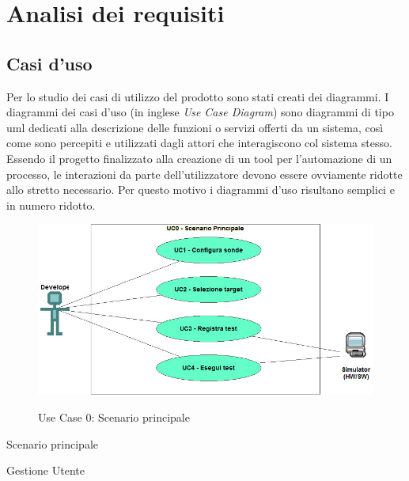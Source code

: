 \chapter{Analisi dei requisiti}
\label{chap:analisi-requisiti}

\section{Casi d'uso}
Per lo studio dei casi di utilizzo del prodotto sono stati creati dei diagrammi.
I diagrammi dei casi d'uso (in inglese \textit{Use Case Diagram}) sono diagrammi di tipo \gls{uml} dedicati alla descrizione delle funzioni o servizi offerti da un sistema, così come sono percepiti e utilizzati dagli attori che interagiscono col sistema stesso.
Essendo il progetto finalizzato alla creazione di un tool per l'automazione di un processo, le interazioni da parte dell'utilizzatore devono essere ovviamente ridotte allo stretto necessario. Per questo motivo i diagrammi d'uso risultano semplici e in numero ridotto.

\begin{figure}[ht]
    \vspace{2em}
    \centering
    \includegraphics[alt={Testo alternativo dell'immagine}, width=0.75\columnwidth]{img/usecase/scenario-principale.jpeg}
    \caption{Use Case 0: Scenario principale}
    \label{fig:scenario_principale}
\end{figure}

\begin{usecase}{0}{Scenario principale}
    \label{uc:uc_scenario_principale}
\end{usecase}

\begin{usecase}{1}{Gestione Utente}
    \label{uc:uc_casi_uso}
\end{usecase}

